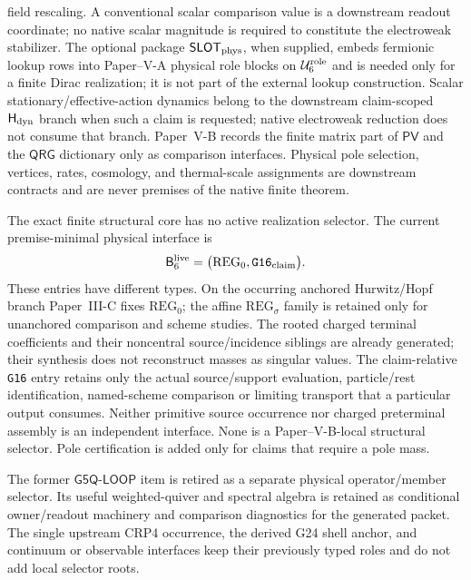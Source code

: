 \documentclass[12pt,a4paper]{article}
\newcommand{\BridgeLive}{\mathsf B_6^{\rm live}}
\newcommand{\Urole}{\mathcal U_6^{\rm role}}
\begin{document}
\begin{definition}
field rescaling.  A conventional scalar comparison value is a downstream readout coordinate; no native scalar magnitude is required to constitute the electroweak stabilizer.
The optional package \(\mathsf{SLOT}_{\rm phys}\), when supplied, embeds
fermionic lookup rows into Paper--V-A physical role blocks on \(\Urole\) and is
needed only for a finite Dirac realization; it is not part of the external
lookup construction.
Scalar stationary/effective-action dynamics belong to the downstream claim-scoped
\(\mathsf H_{\rm dyn}\) branch when such a claim is requested; native electroweak reduction does not consume that branch.  Paper~V-B records the finite matrix part of
\(\mathsf{PV}\) and the \(\mathsf{QRG}\) dictionary only as comparison
interfaces.  Physical pole selection, vertices, rates, cosmology, and
thermal-scale assignments are downstream contracts and are never premises of
the native finite theorem.
\end{definition}

\begin{definition}
\label{p6:def:selector-status-partition}
The exact finite structural core has no active realization selector.  The
current premise-minimal physical interface is
\[
 \BridgeLive=
 \bigl(\mathrm{REG}_{0},\texttt{G16}_{\rm claim}\bigr).
\]
These entries have different types.  On the occurring anchored Hurwitz/Hopf
branch Paper~III-C fixes \(\mathrm{REG}_0\); the affine
\(\mathrm{REG}_{\sigma}\) family is retained only for unanchored comparison
and scheme studies. The rooted charged terminal coefficients and their
noncentral source/incidence siblings are already generated; their synthesis
does not reconstruct masses as singular values. The claim-relative
\texttt{G16} entry retains only the actual source/support evaluation,
particle/rest identification, named-scheme comparison or limiting transport
that a particular output consumes. Neither primitive source occurrence nor
charged preterminal assembly is an independent interface.  None is a
Paper--V-B-local structural selector.
Pole certification is added only for claims that require a pole mass.

The former \(\mathsf{G5Q\mbox{-}LOOP}\) item is retired as a separate physical
operator/member selector.  Its useful weighted-quiver and spectral algebra is
retained as conditional owner/readout machinery and comparison diagnostics for the generated packet.  The
single upstream CRP4 occurrence, the derived G24 shell anchor, and continuum or
observable interfaces keep their previously typed roles and do not add local
selector roots.
\end{definition}
\end{document}
